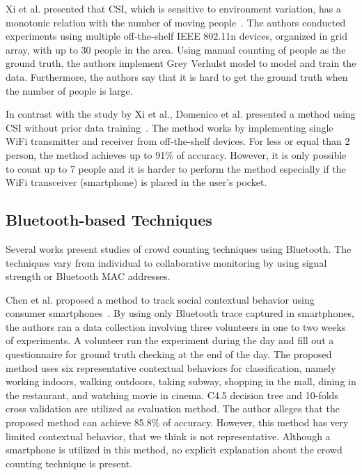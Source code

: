 	Xi et al. presented that \ac{CSI}, which is sensitive to environment variation, has a monotonic relation with the number of moving people~\cite{thesis006}. The authors conducted experiments using multiple off-the-shelf IEEE 802.11n devices, organized in grid array, with up to 30 people in the area. Using manual counting of people as the ground truth, the authors implement Grey Verhulst model to model and train the data. Furthermore, the authors say that it is hard to get the ground truth when the number of people is large.

	In contrast with the study by Xi et al., Domenico et al. presented a method using \ac{CSI} without prior data training~\cite{thesis051}. The method works by implementing single WiFi transmitter and receiver from off-the-shelf devices. For less or equal than 2 person, the method achieves up to 91\% of accuracy. However, it is only possible to count up to 7 people and it is harder to perform the method especially if the WiFi transceiver (smartphone) is placed in the user's pocket.
	

	

	



	


	

	

	

	










	\subsection{Bluetooth-based Techniques} %
	\label{sub:bluetooth-based-techniques}
	Several works present studies of crowd counting techniques using Bluetooth. The techniques vary from individual to collaborative monitoring by using signal strength or Bluetooth \ac{MAC} addresses. 

	Chen et al. proposed a method to track social contextual behavior using consumer smartphones~\cite{thesis028}. By using only Bluetooth trace captured in smartphones, the authors ran a data collection involving three volunteers in one to two weeks of experiments. A volunteer run the experiment during the day and fill out a questionnaire for ground truth checking at the end of the day. The proposed method uses six representative contextual behaviors for classification, namely working indoors, walking outdoors, taking subway, shopping in the mall, dining in the restaurant, and watching movie in cinema.
	C4.5 decision tree and 10-folds cross validation are utilized as evaluation method. The author alleges that the proposed method can achieve 85.8\% of accuracy. However, this method has very limited contextual behavior, that we think is not representative. Although a smartphone is utilized in this method, no explicit explanation about the crowd counting technique is present.

